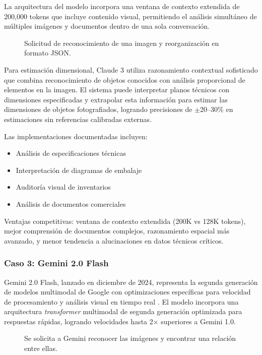 La arquitectura del modelo incorpora una ventana de contexto extendida de 200,000 tokens que incluye contenido visual, permitiendo el análisis simultáneo de múltiples imágenes y documentos dentro de una sola conversación.

\begin{figure}[H]
    \centering
    \caption{Solicitud de reconocimiento de una imagen y reorganización en formato JSON.}
    \label{fig:claude3_json}
\end{figure}

Para estimación dimensional, Claude 3 utiliza razonamiento contextual sofisticado que combina reconocimiento de objetos conocidos con análisis proporcional de elementos en la imagen. El sistema puede interpretar planos técnicos con dimensiones especificadas y extrapolar esta información para estimar las dimensiones de objetos fotografiados, logrando precisiones de $\pm$20--30\% en estimaciones sin referencias calibradas externas.

Las implementaciones documentadas incluyen:
\begin{itemize}
    \item Análisis de especificaciones técnicas
    \item Interpretación de diagramas de embalaje
    \item Auditoría visual de inventarios
    \item Análisis de documentos comerciales
\end{itemize}

Ventajas competitivas: ventana de contexto extendida (200K vs 128K tokens), mejor comprensión de documentos complejos, razonamiento espacial más avanzado, y menor tendencia a alucinaciones en datos técnicos críticos.

\subsubsection{Caso 3: Gemini 2.0 Flash}

Gemini 2.0 Flash, lanzado en diciembre de 2024, representa la segunda generación de modelos multimodal de Google con optimizaciones específicas para velocidad de procesamiento y análisis visual en tiempo real \cite{Team20251}. El modelo incorpora una arquitectura \textit{transformer} multimodal de segunda generación optimizada para respuestas rápidas, logrando velocidades hasta 2$\times$ superiores a Gemini 1.0.

\begin{figure}[H]
    \centering
    \caption{Se solicita a Gemini reconocer las imágenes y encontrar una relación entre ellas.}
    \label{fig:gemini_analysis}
\end{figure}

